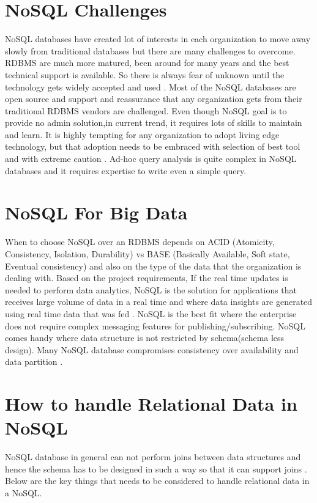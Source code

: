 \documentclass[sigconf]{acmart}
\begin{document}
\section{NoSQL Challenges}

NoSQL databases have created lot of interests in each organization to move away slowly from traditional databases but there are many challenges to overcome. RDBMS are much more matured, been around for many years and the best technical support is available. So there is always fear of unknown until the technology gets widely accepted and used \cite{neal}. Most of the NoSQL databases are open source and support and reassurance that any organization gets from their traditional RDBMS vendors are challenged. Even though NoSQL goal is to provide no admin solution,in current trend, it requires lots of skills to maintain and learn. It is highly tempting for any organization to adopt living edge technology, but that adoption needs to be embraced with selection of best tool and with extreme caution \cite{dbkumar}. Ad-hoc query analysis is quite complex in NoSQL databases and it requires expertise to write even a simple query.

\section{NoSQL For Big Data}

When to choose NoSQL over an RDBMS depends on ACID (Atomicity, Consistency, Isolation, Durability) vs BASE (Basically Available, Soft state, Eventual consistency) and also on the type of the data that the organization is dealing with. Based on the project requirements, If the real time updates is needed to perform data analytics, NoSQL is the solution for applications that receives large volume of data in a real time and where data insights are generated using real time data that was fed \cite{datastax}. NoSQL is the best fit where the enterprise does not require complex messaging features for publishing/subscribing. NoSQL comes handy where data structure is not restricted by schema(schema less design). Many NoSQL database compromises consistency over availability and data partition \cite{volt}.

\section{How to handle Relational Data in NoSQL}

NoSQL database in general can not perform joins between data structures and hence the schema has to be designed in such a way so that it can support joins \cite{vish}. Below are the key things that needs to be considered to handle relational data in a NoSQL.
\end{document}
